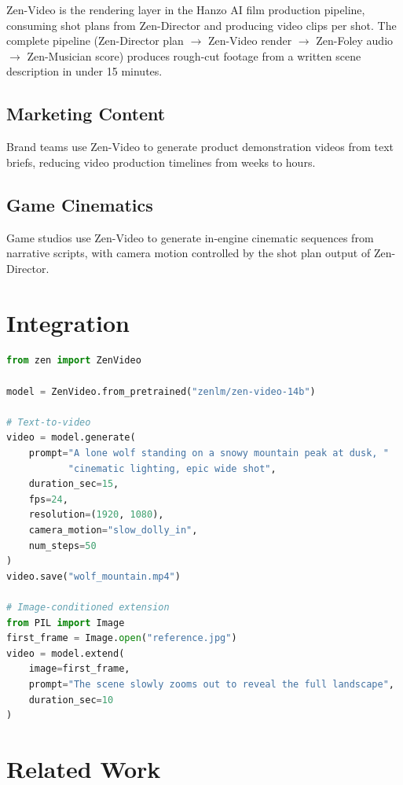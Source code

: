 \documentclass[11pt,a4paper]{article}
\begin{document}
Zen-Video is the rendering layer in the Hanzo AI film production pipeline, consuming shot plans
from Zen-Director and producing video clips per shot. The complete pipeline (Zen-Director plan
$\to$ Zen-Video render $\to$ Zen-Foley audio $\to$ Zen-Musician score) produces rough-cut
footage from a written scene description in under 15 minutes.

\subsection{Marketing Content}

Brand teams use Zen-Video to generate product demonstration videos from text briefs, reducing
video production timelines from weeks to hours.

\subsection{Game Cinematics}

Game studios use Zen-Video to generate in-engine cinematic sequences from narrative scripts,
with camera motion controlled by the shot plan output of Zen-Director.

\section{Integration}

\begin{lstlisting}[language=Python, caption=Zen-Video Generation]
from zen import ZenVideo

model = ZenVideo.from_pretrained("zenlm/zen-video-14b")

# Text-to-video
video = model.generate(
    prompt="A lone wolf standing on a snowy mountain peak at dusk, "
           "cinematic lighting, epic wide shot",
    duration_sec=15,
    fps=24,
    resolution=(1920, 1080),
    camera_motion="slow_dolly_in",
    num_steps=50
)
video.save("wolf_mountain.mp4")

# Image-conditioned extension
from PIL import Image
first_frame = Image.open("reference.jpg")
video = model.extend(
    image=first_frame,
    prompt="The scene slowly zooms out to reveal the full landscape",
    duration_sec=10
)
\end{lstlisting}

\section{Related Work}
\end{document}
